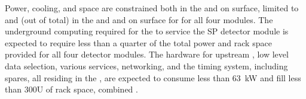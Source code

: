 Power, cooling, and space are constrained both in the  and on surface, limited to \daqpower and \daqracks (out of \cucracks total) in the  and \surfdaqpower and \surfdaqracks on surface for  for all four  modules.
The underground computing required for the  to service the SP detector module is expected to require less than a quarter of the total power and rack space provided for all four detector modules. 
The hardware for upstream , low level data selection,
various services, networking, and the timing system, including spares,
all residing in the , 
are expected to consume less than \SI{63}{\kilo\watt} and fill less
than 300U of rack space, combined \cite{ale}.



